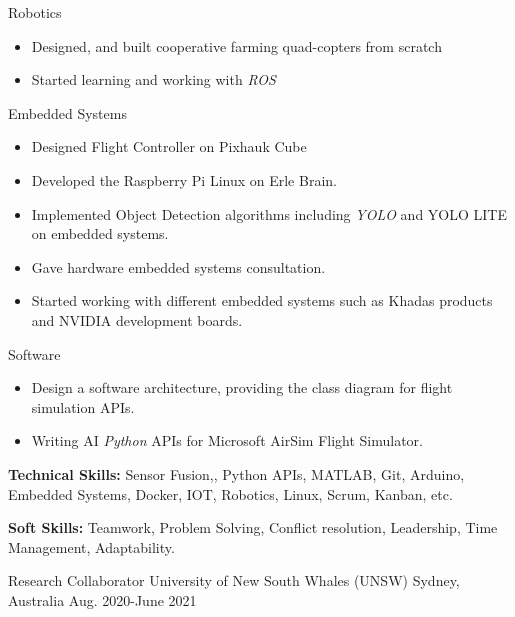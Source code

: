 \begin{cventries}
    {
      \begin{cvitems} %
        \item{Robotics}
        \begin{itemize}[label= - ]
            \item {Designed, and built cooperative farming quad-copters from scratch}
             \item {Started learning and working with \textit{ROS}}
        \end{itemize}
        \item{Embedded Systems}
        \begin{itemize}[label=-]
            \item {Designed Flight Controller on Pixhauk Cube}
            \item {Developed the Raspberry Pi Linux on Erle Brain.}
            \item {Implemented Object Detection algorithms including \textit{YOLO} and YOLO LITE on embedded systems.}
            \item {Gave hardware embedded systems consultation.}
            \item {Started working with different embedded systems such as Khadas products and NVIDIA development boards.}
        \end{itemize}
        \item{Software}
        \begin{itemize}[label = -]
        \item {Design a software architecture, providing the class diagram for flight simulation APIs.}
            \item {Writing AI \textit{Python} APIs for Microsoft AirSim Flight Simulator.}
        \end{itemize}
        \item {\textbf{Technical Skills:} Sensor Fusion,, Python APIs, MATLAB, Git, Arduino, Embedded Systems, Docker, IOT, Robotics, Linux, Scrum, Kanban, etc.}
        \item {\textbf{Soft Skills:} Teamwork, Problem Solving, Conflict resolution, Leadership, Time Management, Adaptability.}
      \end{cvitems}
    } 
  \cventry
    {Research Collaborator}  %
    {University of New South Whales (UNSW)} %
    {Sydney, Australia} %
    {Aug. 2020-June 2021} %
    {
      \begin{cvitems} %

\end{cvitems}}
\end{cventries}
